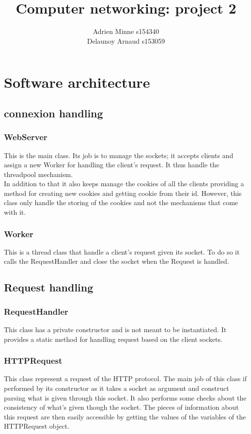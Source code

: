 \documentclass[11pt]{article}
\title{Computer networking: project 2}
\author{ Adrien Minne s154340 \\ Delaunoy Arnaud s153059}
\date{}
\begin{document}
\begin{titlepage}
\maketitle
\setcounter{page}{0}
\thispagestyle{empty}
\end{titlepage}

\section{Software architecture}

\subsection{connexion handling}

\subsubsection{WebServer}
This is the main class. Its job is to manage the sockets; it accepts clients and assign a new Worker for handling the client's request. It thus handle the threadpool mechanism.\\
In addition to that it also keeps manage the cookies of all the clients providing a method for creating new cookies and getting cookie from their id. However, this class only handle the storing of the cookies and not the mechanisms that come with it.

\subsubsection{Worker}
This is a thread class that handle a client's request given its socket. To do so it calls the RequestHandler and close the socket when the Request is handled.

\subsection{Request handling}

\subsubsection{RequestHandler}
This class has a private constructor and is not meant to be instantiated. It provides a static method for handling request based on the client sockets.

\subsubsection{HTTPRequest}
This class represent a request of the HTTP protocol. The main job of this class if performed by its constructor as it takes a socket as argument and construct parsing what is given through this socket. It also performs some checks about the consistency of what's given though the socket. The pieces of information about this request are then easily accessible by getting the values of the variables of the HTTPRequest object.
\end{document}
